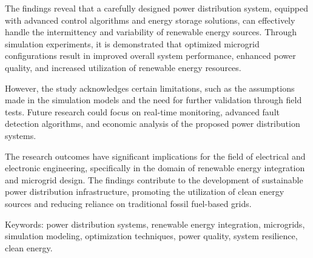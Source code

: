 The findings reveal that a carefully designed power distribution system, equipped with advanced control algorithms and energy storage solutions, can effectively handle the intermittency and variability of renewable energy sources. Through simulation experiments, it is demonstrated that optimized microgrid configurations result in improved overall system performance, enhanced power quality, and increased utilization of renewable energy resources.

However, the study acknowledges certain limitations, such as the assumptions made in the simulation models and the need for further validation through field tests. Future research could focus on real-time monitoring, advanced fault detection algorithms, and economic analysis of the proposed power distribution systems.

The research outcomes have significant implications for the field of electrical and electronic engineering, specifically in the domain of renewable energy integration and microgrid design. The findings contribute to the development of sustainable power distribution infrastructure, promoting the utilization of clean energy sources and reducing reliance on traditional fossil fuel-based grids.

Keywords: power distribution systems, renewable energy integration, microgrids, simulation modeling, optimization techniques, power quality, system resilience, clean energy.



\endinput